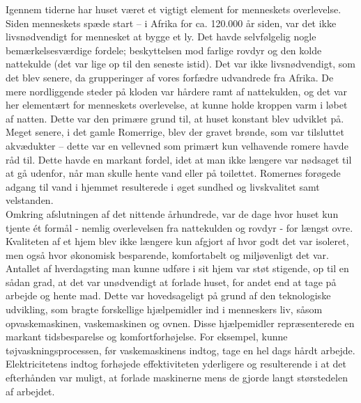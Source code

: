 Igennem tiderne har huset været et vigtigt element for menneskets overlevelse. Siden menneskets spæde start – i Afrika for ca. 120.000 år siden\cite{HumanOrigen}, var det ikke livsnødvendigt for mennesket at bygge et ly. Det havde selvfølgelig nogle bemærkelsesværdige fordele; beskyttelsen mod farlige rovdyr og den kolde nattekulde (det var lige op til den seneste istid)\cite{RecentIceages}. Det var ikke livsnødvendigt, som det blev senere, da grupperinger af vores forfædre udvandrede fra Afrika\cite{HumanOrigen}. De mere nordliggende steder på kloden var hårdere ramt af nattekulden, og det var her elementært for menneskets overlevelse, at kunne holde kroppen varm i løbet af natten. Dette var den primære grund til, at huset konstant blev udviklet på.\\

Meget senere, i det gamle Romerrige, blev der gravet brønde, som var tilsluttet akvædukter – dette var en vellevned som primært kun velhavende romere havde råd til. Dette havde en markant fordel, idet at man ikke længere var nødsaget til at gå udenfor, når man skulle hente vand eller på toilettet. Romernes forøgede adgang til vand i hjemmet resulterede i øget sundhed og livskvalitet samt velstanden.\cite{VandRom} \\

Omkring afslutningen af det nittende århundrede, var de dage hvor huset kun tjente ét formål - nemlig overlevelsen fra nattekulden og rovdyr - for længst ovre. Kvaliteten af et hjem blev ikke længere kun afgjort af hvor godt det var isoleret, men også hvor økonomisk besparende, komfortabelt og miljøvenligt det var. Antallet af hverdagsting man kunne udføre i sit hjem var støt stigende, op til en sådan grad, at det var unødvendigt at forlade huset, for andet end at tage på arbejde og hente mad. Dette var hovedsageligt på grund af den teknologiske udvikling, som bragte forskellige hjælpemidler ind i menneskers liv, såsom opvaskemaskinen, vaskemaskinen og ovnen. Disse hjælpemidler repræsenterede en markant tidsbesparelse og komfortforhøjelse. For eksempel, kunne tøjvaskningsprocessen, før vaskemaskinens indtog, tage en hel dags hårdt arbejde\cite{Houseworklate19th}. Elektricitetens indtog forhøjede effektiviteten yderligere og resulterende i at det efterhånden var muligt, at forlade maskinerne mens de gjorde langt størstedelen af arbejdet.\\



